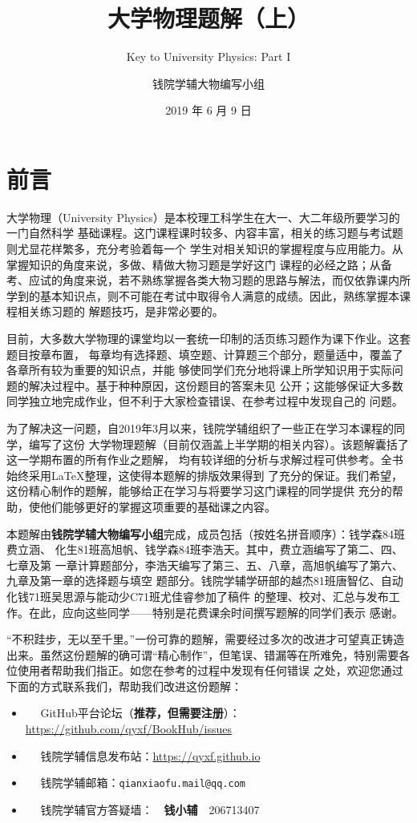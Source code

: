 \documentclass[b5paper,opensource,sourcefont,parskip]{qyxf-book}
\title{大学物理题解（上）}
\subtitle{Key to University Physics: Part I}
\author{钱院学辅大物编写小组}
\date{2019 年 6 月 9 日}
\begin{document}
\pagestyle{plain}
\chapter*{前言}
大学物理（University Physics）是本校理工科学生在大一、大二年级所要学习的一门自然科学
基础课程。这门课程课时较多、内容丰富，相关的练习题与考试题则尤显花样繁多，充分考验着每一个
学生对相关知识的掌握程度与应用能力。从掌握知识的角度来说，多做、精做大物习题是学好这门
课程的必经之路；从备考、应试的角度来说，若不熟练掌握各类大物习题的思路与解法，而仅依靠课内所
学到的基本知识点，则不可能在考试中取得令人满意的成绩。因此，熟练掌握本课程相关练习题的
解题技巧，是非常必要的。

目前，大多数大学物理的课堂均以一套统一印制的活页练习题作为课下作业。这套题目按章布置，
每章均有选择题、填空题、计算题三个部分，题量适中，覆盖了各章所有较为重要的知识点，并能
够使同学们充分地将课上所学知识用于实际问题的解决过程中。基于种种原因，这份题目的答案未见
公开；这能够保证大多数同学独立地完成作业，但不利于大家检查错误、在参考过程中发现自己的
问题。

为了解决这一问题，自2019年3月以来，钱院学辅组织了一些正在学习本课程的同学，编写了这份
大学物理题解（目前仅涵盖上半学期的相关内容）。该题解囊括了这一学期布置的所有作业之题解，
均有较详细的分析与求解过程可供参考。全书始终采用\LaTeX 整理，这使得本题解的排版效果得到
了充分的保证。我们希望，这份精心制作的题解，能够给正在学习与将要学习这门课程的同学提供
充分的帮助，使他们能够更好的掌握这项重要的基础课之内容。

本题解由\textbf{钱院学辅大物编写小组}完成，成员包括（按姓名拼音顺序）：钱学森84班费立涵、
化生81班高旭帆、钱学森84班李浩天。其中，费立涵编写了第二、四、七章及第
一章计算题部分，李浩天编写了第三、五、八章，高旭帆编写了第六、九章及第一章的选择题与填空
题部分。钱院学辅学研部的越杰81班唐智亿、自动化钱71班吴思源与能动少C71班尤佳睿参加了稿件
的整理、校对、汇总与发布工作。在此，应向这些同学——特别是花费课余时间撰写题解的同学们表示
感谢。

“不积跬步，无以至千里。”一份可靠的题解，需要经过多次的改进才可望真正铸造出来。虽然这份题解的确可谓“精心制作”，但笔误、错漏等在所难免，特别需要各位使用者帮助我们指正。如您在参考的过程中发现有任何错误
之处，欢迎您通过下面的方式联系我们，帮助我们改进这份题解：
\begin{itemize}
	\item \faGithub ~~ GitHub平台论坛（\textbf{推荐，但需要注册}）：\url{https://github.com/qyxf/BookHub/issues}
	\item \faInternetExplorer ~~ 钱院学辅信息发布站：\url{https://qyxf.github.io}
	\item \faEnvelopeOpen ~~ 钱院学辅邮箱：\texttt{qianxiaofu.mail@qq.com}
	\item \faQq ~~ 钱院学辅官方答疑墙：~~\textbf{钱小辅}~~206713407
\end{itemize}
\end{document}
